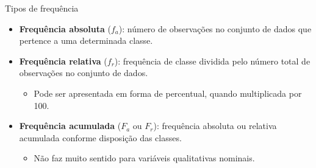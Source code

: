 \documentclass[
  ignorenonframetext,
  serif,
  professionalfont,
  usenames,
  dvipsnames,
  aspectratio = 169]{beamer}
\providecommand{\tightlist}{%
  \setlength{\itemsep}{0pt}\setlength{\parskip}{0pt}}
\renewcommand{\tightlist}{%
  \setlength{\itemsep}{0\baselineskip}
  \setlength{\parskip}{0.25\baselineskip}
}
\begin{document}
\begin{frame}{Tipos de frequência}
\protect\hypertarget{tipos-de-frequuxeancia}{}
\begin{itemize}
\item
  \textbf{Frequência absoluta} (\(f_a\)): número de observações no
  conjunto de dados que pertence a uma determinada classe.
\item
  \textbf{Frequência relativa} (\(f_r\)): frequência de classe dividida
  pelo número total de observações no conjunto de dados.

  \begin{itemize}
  \tightlist
  \item
    Pode ser apresentada em forma de percentual, quando multiplicada por
    100.
  \end{itemize}
\item
  \textbf{Frequência acumulada} (\(F_a\) ou \(F_r\)): frequência
  absoluta ou relativa acumulada conforme disposição das classes.

  \begin{itemize}
  \tightlist
  \item
    Não faz muito sentido para variáveis qualitativas nominais.
  \end{itemize}
\end{itemize}
\end{frame}
\end{document}
